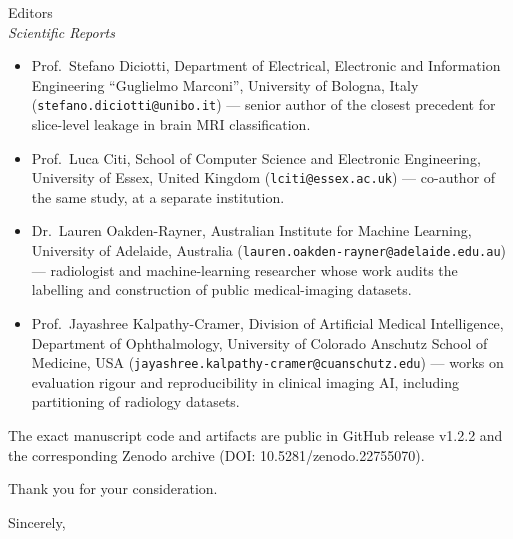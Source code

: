 \documentclass[11pt]{letter}
\begin{document}
\begin{letter}{Editors\\\textit{Scientific Reports}}
\begin{itemize}
\itemsep2pt
\item Prof.\ Stefano Diciotti, Department of Electrical, Electronic and Information Engineering ``Guglielmo Marconi'', University of Bologna, Italy (\texttt{stefano.diciotti@unibo.it}) --- senior author of the closest precedent for slice-level leakage in brain MRI classification.
\item Prof.\ Luca Citi, School of Computer Science and Electronic Engineering, University of Essex, United Kingdom (\texttt{lciti@essex.ac.uk}) --- co-author of the same study, at a separate institution.
\item Dr.\ Lauren Oakden-Rayner, Australian Institute for Machine Learning, University of Adelaide, Australia (\texttt{lauren.oakden-rayner@adelaide.edu.au}) --- radiologist and machine-learning researcher whose work audits the labelling and construction of public medical-imaging datasets.
\item Prof.\ Jayashree Kalpathy-Cramer, Division of Artificial Medical Intelligence, Department of Ophthalmology, University of Colorado Anschutz School of Medicine, USA (\texttt{jayashree.kalpathy-cramer@cuanschutz.edu}) --- works on evaluation rigour and reproducibility in clinical imaging AI, including partitioning of radiology datasets.
\end{itemize}

The exact manuscript code and artifacts are public in GitHub release v1.2.2 and the corresponding Zenodo archive (DOI: 10.5281/zenodo.22755070).

Thank you for your consideration.

\closing{Sincerely,}
\end{letter}
\end{document}
